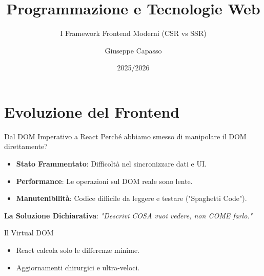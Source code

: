 \documentclass[10pt]{beamer}
\title[Lezione 5]{Programmazione e Tecnologie Web}
\subtitle{I Framework Frontend Moderni (CSR vs SSR)}
\author{Giuseppe Capasso}
\date{2025/2026}
\begin{document}
\begin{frame}
    \titlepage
\end{frame}

\section{Evoluzione del Frontend}
\begin{frame}{Dal DOM Imperativo a React}
    Perché abbiamo smesso di manipolare il DOM direttamente?
    \begin{itemize}
        \item \textbf{Stato Frammentato}: Difficoltà nel sincronizzare dati e UI.
        \item \textbf{Performance}: Le operazioni sul DOM reale sono lente.
        \item \textbf{Manutenibilità}: Codice difficile da leggere e testare ("Spaghetti Code").
    \end{itemize}
    \vspace{0.3cm}
    \textbf{La Soluzione Dichiarativa}:
    \textit{"Descrivi COSA vuoi vedere, non COME farlo."}
\end{frame}

\begin{frame}{Il Virtual DOM}
    \centering
    \begin{itemize}
        \item React calcola solo le differenze minime.
        \item Aggiornamenti chirurgici e ultra-veloci.
    \end{itemize}
\end{frame}
\end{document}
